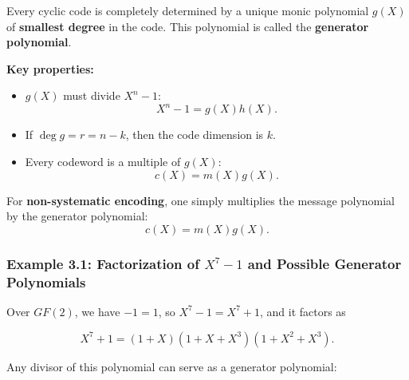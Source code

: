 \documentclass[
]{article}
\providecommand{\tightlist}{%
  \setlength{\itemsep}{0pt}\setlength{\parskip}{0pt}}
\begin{document}
Every cyclic code is completely determined by a unique monic polynomial
\(g(X)\) of \textbf{smallest degree} in the code. This polynomial is
called the \textbf{generator polynomial}.

\textbf{Key properties:}

\begin{itemize}
\tightlist
\item
  \(g(X)\) must divide \(X^n-1\): \[X^n-1 = g(X)h(X).\]
\item
  If \(\deg g = r = n-k\), then the code dimension is \(k\).
\item
  Every codeword is a multiple of \(g(X)\): \[c(X)=m(X)g(X).\]
\end{itemize}

For \textbf{non-systematic encoding}, one simply multiplies the message
polynomial by the generator polynomial: \[c(X)=m(X)g(X).\]

\subsubsection{\texorpdfstring{Example 3.1: Factorization of \(X^7-1\)
and Possible Generator
Polynomials}{Example 3.1: Factorization of X\^{}7-1 and Possible Generator Polynomials}}\label{example-3.1-factorization-of-x7-1-and-possible-generator-polynomials}

Over \(GF(2)\), we have \(-1=1\), so \(X^7-1 = X^7+1\), and it factors
as

\[X^7+1 = (1+X)(1+X+X^3)(1+X^2+X^3).\]

Any divisor of this polynomial can serve as a generator polynomial:
\end{document}
